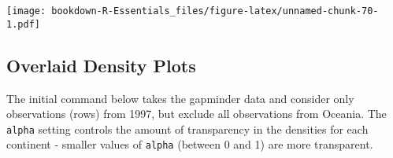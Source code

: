 \documentclass[]{book}
\newenvironment{Shaded}{\begin{snugshade}}{\end{snugshade}}
\newcommand{\KeywordTok}[1]{\textcolor[rgb]{0.13,0.29,0.53}{\textbf{#1}}}
\newcommand{\DataTypeTok}[1]{\textcolor[rgb]{0.13,0.29,0.53}{#1}}
\newcommand{\DecValTok}[1]{\textcolor[rgb]{0.00,0.00,0.81}{#1}}
\newcommand{\FloatTok}[1]{\textcolor[rgb]{0.00,0.00,0.81}{#1}}
\newcommand{\StringTok}[1]{\textcolor[rgb]{0.31,0.60,0.02}{#1}}
\newcommand{\CommentTok}[1]{\textcolor[rgb]{0.56,0.35,0.01}{\textit{#1}}}
\newcommand{\OperatorTok}[1]{\textcolor[rgb]{0.81,0.36,0.00}{\textbf{#1}}}
\newcommand{\NormalTok}[1]{#1}
\begin{document}
\begin{Shaded}
\end{Shaded}

\texttt{[image: bookdown-R-Essentials\_files/figure-latex/unnamed-chunk-70-1.pdf]}

\subsection{Overlaid Density Plots}\label{overlaid-density-plots}

The initial command below takes the gapminder data and consider only
observations (rows) from 1997, but exclude all observations from
Oceania. The \texttt{alpha} setting controls the amount of transparency
in the densities for each continent - smaller values of \texttt{alpha}
(between 0 and 1) are more transparent.
\end{document}
